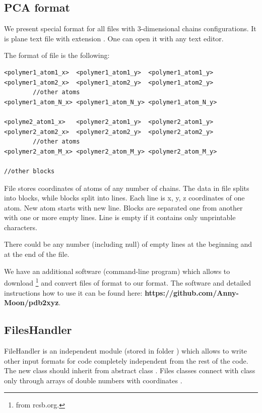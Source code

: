 \documentclass[12pt]{article}
\begin{document}
\begin{mySection}
\subsection{PCA format }\label{sec:.pca}
We present special format for all files with 3-dimensional chains configurations. It is plane text file with extension . One can open it with any text editor.

The format of   file is the following:

\begin{lstlisting}
<polymer1_atom1_x>	<polymer1_atom1_y>	<polymer1_atom1_y>
<polymer1_atom2_x>	<polymer1_atom2_y>	<polymer1_atom2_y>
		//other atoms	
<polymer1_atom_N_x>	<polymer1_atom_N_y>	<polymer1_atom_N_y>

<polyme2_atom1_x>	<polymer2_atom1_y>	<polymer2_atom1_y>
<polymer2_atom2_x>	<polymer2_atom2_y>	<polymer2_atom2_y>
		//other atoms	
<polymer2_atom_M_x>	<polymer2_atom_M_y>	<polymer2_atom_M_y>

//other blocks
\end{lstlisting}
File stores coordinates of atoms of any number of chains. The data in file splits into blocks, while blocks split into lines. Each line is x, y, z coordinates of one atom. New atom starts with new line.
Blocks are separated one from another with one or more empty lines. Line is empty if it contains only unprintable characters.

There could be any number (including null) of empty lines at the beginning and at the end of the file.

We have an additional software (command-line program) which allows to download \footnote{from rcsb.org.} and convert files of  format to our  format. The software and detailed instructions how to use it can be found here: \textbf{https://github.com/Anny-Moon/pdb2xyz}.

\subsection{FilesHandler}\label{sec:inputFilesHandler}
FileHandler is an independent module (stored in folder ) which allows to write other input formats for \PCA code completely independent from the rest of the code. The new class should inherit from abstract class . Files classes connect with class  only through arrays of double numbers with coordinates .


\end{mySection}
\end{document}
